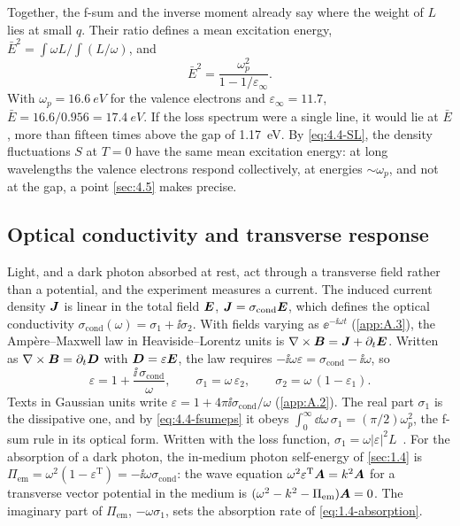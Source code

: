 Together, the f-sum and the inverse moment already say where the weight of $L$ lies at small $q$. Their ratio defines a mean excitation energy, $\bar E^2 = \int\omega L/\int(L/\omega)$, and
\begin{equation}
  \bar E^2 = \frac{\omega_p^2}{1 - 1/\varepsilon_\infty} .
  \label{eq:4.4-Ebar}
\end{equation}
With $\omega_p = \SI{16.6}{eV}$ for the valence electrons and $\varepsilon_\infty = 11.7$, $\bar E = 16.6/0.956 = \SI{17.4}{eV}$. If the loss spectrum were a single line, it would lie at $\bar E$, more than fifteen times above the gap of \SI{1.17}{eV}. By \cref{eq:4.4-SL}, the density fluctuations $S$ at $T = 0$ have the same mean excitation energy: at long wavelengths the valence electrons respond collectively, at energies $\sim\omega_p$, and not at the gap, a point \cref{sec:4.5} makes precise.

\subsection{Optical conductivity and transverse response}

Light, and a dark photon absorbed at rest, act through a transverse field rather than a potential, and the experiment measures a current. The induced current density $\bm{J}$ is linear in the total field $\bm{E}$, $\bm{J} = \sigma_{\mathrm{cond}}\bm{E}$, which defines the optical conductivity $\sigma_{\mathrm{cond}}(\omega) = \sigma_1 + \ii\sigma_2$. With fields varying as $\ee^{-\ii\omega t}$ (\cref{app:A.3}), the Amp\`ere--Maxwell law in Heaviside--Lorentz units is $\nabla\times\bm{B} = \bm{J} + \partial_t\bm{E}$. Written as $\nabla\times\bm{B} = \partial_t\bm{D}$ with $\bm{D} = \varepsilon\bm{E}$, the law requires $-\ii\omega\varepsilon = \sigma_{\mathrm{cond}} - \ii\omega$, so
\begin{equation}
  \varepsilon = 1 + \frac{\ii\,\sigma_{\mathrm{cond}}}{\omega}, \qquad \sigma_1 = \omega\,\varepsilon_2, \qquad \sigma_2 = \omega\,(1 - \varepsilon_1) .
  \label{eq:4.4-sigma}
\end{equation}
Texts in Gaussian units write $\varepsilon = 1 + 4\pi\ii\sigma_{\mathrm{cond}}/\omega$ (\cref{app:A.2}). The real part $\sigma_1$ is the dissipative one, and by \cref{eq:4.4-fsumeps} it obeys $\int_0^\infty\dd\omega\,\sigma_1 = (\pi/2)\omega_p^2$, the f-sum rule in its optical form. Written with the loss function, $\sigma_1 = \omega|\varepsilon|^2L$~\cite{hochberg2021determining}. For the absorption of a dark photon, the in-medium photon self-energy of \cref{sec:1.4} is $\Pi_{\mathrm{em}} = \omega^2(1 - \varepsilon^{\mathrm{T}}) = -\ii\omega\sigma_{\mathrm{cond}}$: the wave equation $\omega^2\varepsilon^{\mathrm{T}}\bm{A} = k^2\bm{A}$ for a transverse vector potential in the medium is $(\omega^2 - k^2 - \Pi_{\mathrm{em}})\bm{A} = 0$. The imaginary part of $\Pi_{\mathrm{em}}$, $-\omega\sigma_1$, sets the absorption rate of \cref{eq:1.4-absorption}.

